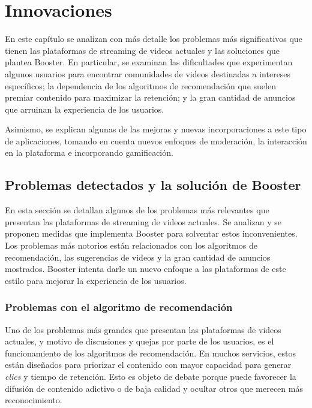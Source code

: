 \chapter{Innovaciones}

En este capítulo se analizan con más detalle los problemas más significativos que tienen las plataformas de streaming de videos actuales y las soluciones que plantea Booster. En particular, se examinan las dificultades que experimentan algunos usuarios para encontrar comunidades de videos destinadas a intereses específicos; la dependencia de los algoritmos de recomendación que suelen premiar contenido para maximizar la retención; y la gran cantidad de anuncios que arruinan la experiencia de los usuarios.

Asimismo, se explican algunas de las mejoras y nuevas incorporaciones a este tipo de aplicaciones, tomando en cuenta nuevos enfoques de moderación, la interacción en la plataforma e incorporando gamificación.

\section{Problemas detectados y la solución de Booster}

En esta sección se detallan algunos de los problemas más relevantes que presentan las plataformas de streaming de videos actuales. Se analizan y se proponen medidas que implementa Booster para solventar estos inconvenientes. Los problemas más notorios están relacionados con los algoritmos de recomendación, las sugerencias de videos y la gran cantidad de anuncios mostrados. Booster intenta darle un nuevo enfoque a las plataformas de este estilo para mejorar la experiencia de los usuarios.  

\subsection{Problemas con el algoritmo de recomendación}

Uno de los problemas más grandes que presentan las plataformas de videos actuales, y motivo de discusiones y quejas por parte de los usuarios, es el funcionamiento de los algoritmos de recomendación. En muchos servicios, estos están diseñados para priorizar el contenido con mayor capacidad para generar \textit{clics} y tiempo de retención. Esto es objeto de debate porque puede favorecer la difusión de contenido adictivo o de baja calidad y ocultar otros que merecen más reconocimiento.


